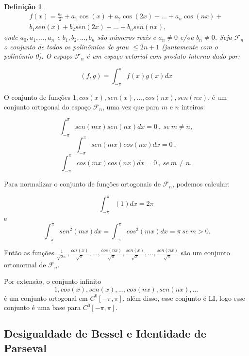 \documentclass[a4paper,portuguese,9pt,final]{extarticle}
\newtheorem*{definition}{Definição}
\begin{document}
\begin{multicols*}{2}
\begin{definition}
                \begin{equation}
                    \begin{split}
                        \displaystyle f(x) = \frac{a_{0}}{2} + a_{1}\cos(x) + a_{2}\cos(2x) + ... + a_{n}\cos(nx) +\\
                            b_{1}sen(x) + b_{2}sen(2x) + ... + b_{n}sen(nx),
                    \end{split}
                \end{equation}
                onde $ a_{0}, a_{1},...,a_{n} $ e $ b_{1}, b_{2},...,b_{n} $ são números reais e $ a_{n}\neq0 $ e/ou $ b_{n}\neq0 $. Seja $ \mathcal{F}_{n} $ o conjunto de todos os polinômios de grau $ \leq 2n+1 $ (juntamente com o polinômio 0). O espaço $ \mathcal{F}_{n} $ é um espaço vetorial com produto interno dado por:


                $$  (f,g)=\int_{-\pi}^{\pi} f(x)g(x)dx   $$ 
            \end{definition}



            O conjunto de funções $ 1, cos(x), sen(x), ... , cos(nx), sen(nx) $, é um conjunto ortogonal do espaço $ \mathcal{F}_{n} $, uma vez que para $ m $ e $ n $ inteiros:

            $$ \int_{-\pi}^{\pi} sen(mx)sen(nx)dx=0 \ ,\ se \ m\neq n, $$
            $$ \int_{-\pi}^{\pi} sen(mx)cos(nx)dx=0 \ ,$$
            $$ \int_{-\pi}^{\pi} cos(mx)cos(nx)dx=0 \ ,\ se \ m\neq n .$$ 


            Para normalizar o conjunto de funções ortogonais de $ \mathcal{F}_{n} $, podemos calcular:

            $$ \int_{-\pi}^{\pi}(1)dx=2\pi $$ e $$\ \int_{-\pi}^{\pi}sen^{2}(mx)dx=\int_{-\pi}^{\pi}cos^{2}(mx)dx=\pi \ se \ m>0.   $$



            Então as funções $ \displaystyle\frac{1}{\sqrt{2\pi}}, \frac{cos(x)}{\sqrt{\pi}}, ... , \frac{cos(nx)}{\sqrt{\pi}}, \frac{sen(x)}{\sqrt{\pi}}, ... , \frac{sen(nx)}{\sqrt{\pi}} $ são um conjunto ortonormal de $ \mathcal{F}_{n} $.

            \smallskip

            Por extensão, o conjunto infinito $$1, cos(x), sen(x), ... , cos(nx), sen(nx), ...$$ é um conjunto ortogonal em $ C^{0}[-\pi,\pi] $, além disso, esse conjunto é LI, logo esse conjunto é uma base para $ C^{0}[-\pi,\pi]. $ \\


        \subsection{Desigualdade de Bessel e Identidade de Parseval}


\end{multicols*}
\end{document}

